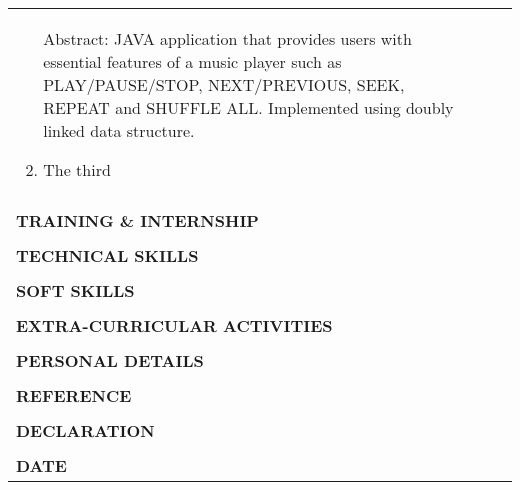 \documentclass[a4paper,12pt,final]{article}
\newcommand\textboxnewz[1]{%
	\parbox{.700\textwidth}{#1}%
}
\begin{document}
\begin{longtable}{L{3cm} cc L{18cm}}
\begin{enumerate}
			\noindent\textboxnewz{Abstract: JAVA application that provides users with essential features of a music player such as PLAY/PAUSE/STOP, NEXT/PREVIOUS, SEEK, REPEAT and SHUFFLE ALL. Implemented using doubly linked data structure.}
			\item The third
		\end{enumerate}\\\\
		\textbf{TRAINING \& INTERNSHIP} &&& \\\\
		\textbf{TECHNICAL SKILLS} &&& \\\\
		\textbf{SOFT SKILLS} &&& \\\\
		\textbf{EXTRA-CURRICULAR ACTIVITIES} &&& \\\\
		\textbf{PERSONAL DETAILS} &&& \\\\
		\textbf{REFERENCE} &&& \\\\
		\textbf{DECLARATION} &&& \\\\
		\textbf{DATE} &&& \\
	\end{longtable}

	
\end{document}
